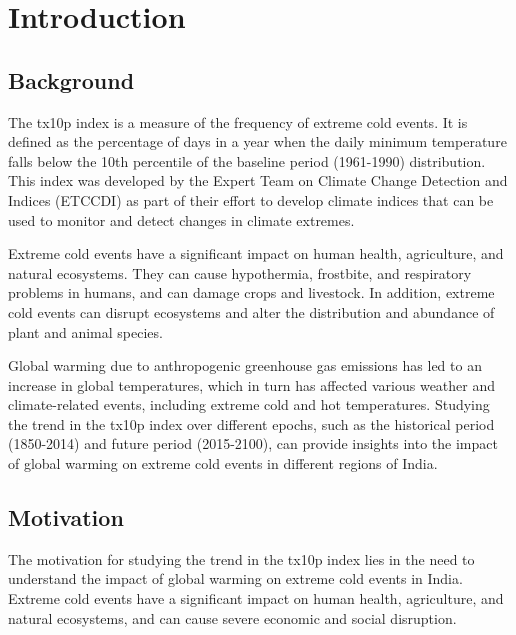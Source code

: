 \documentclass[a4paper, 12pt, twoside]{report}
\begin{document}
\newpage

\listoftables

\tableofcontents

\newpage


\chapter{Introduction}\label{chap:chapter1}
\renewcommand\thefigure{\thechapter.\arabic{figure}}
\renewcommand{\theequation}{\thechapter.\arabic{equation}}
\setcounter{equation}{0}
\setcounter{figure}{0}

\section{Background}
The tx10p index is a measure of the frequency of extreme cold events. It is defined as the percentage of days in a year when the daily minimum temperature falls below the 10th percentile of the baseline period (1961-1990) distribution. This index was developed by the Expert Team on Climate Change Detection and Indices (ETCCDI) as part of their effort to develop climate indices that can be used to monitor and detect changes in climate extremes.

Extreme cold events have a significant impact on human health, agriculture, and natural ecosystems. They can cause hypothermia, frostbite, and respiratory problems in humans, and can damage crops and livestock. In addition, extreme cold events can disrupt ecosystems and alter the distribution and abundance of plant and animal species.

Global warming due to anthropogenic greenhouse gas emissions has led to an increase in global temperatures, which in turn has affected various weather and climate-related events, including extreme cold and hot temperatures. Studying the trend in the tx10p index over different epochs, such as the historical period (1850-2014) and future period (2015-2100), can provide insights into the impact of global warming on extreme cold events in different regions of India.

\section{Motivation}
The motivation for studying the trend in the tx10p index lies in the need to understand the impact of global warming on extreme cold events in India. Extreme cold events have a significant impact on human health, agriculture, and natural ecosystems, and can cause severe economic and social disruption.
\end{document}
